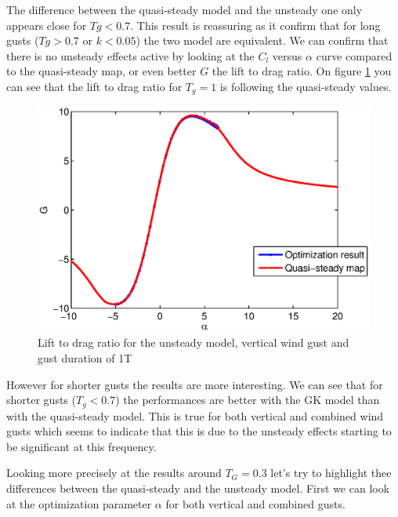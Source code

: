\par The difference between the quasi-steady model and the unsteady one only appears close for $Tg<0.7$.
This result is reassuring as it confirm that for long gusts ($Tg>0.7$ or $k<0.05$) the two model are equivalent.
We can confirm that there is no unsteady effects active by looking at the $C_l$ versus $\alpha$ curve compared to the quasi-steady map, or even better $G$ the lift to drag ratio.
On figure \ref{fig:G_vs_alpha_wt=1_Tg=1_GK.eps} you can see that the lift to drag ratio for $T_g=1$ is following the quasi-steady values.

\begin{figure}[h]
  \centering
  \includegraphics{./Figures/G_vs_alpha_wt=1_Tg=1_GK.eps}
  \caption{Lift to drag ratio for the unsteady model, vertical wind gust and gust duration of 1T}
  \label{fig:G_vs_alpha_wt=1_Tg=1_GK.eps}
\end{figure}

\par However for shorter gusts the results are more interesting.
We can see that for shorter gusts ($T_g<0.7$) the performances are better with the GK model than with the quasi-steady model.
This is true for both vertical and combined wind gusts which seems to indicate that this is due to the unsteady effects starting to be significant at this frequency.

\FloatBarrier

\par Looking more precisely at the results around $T_G=0.3$ let's try to highlight thee differences between the quasi-steady and the unsteady model.
First we can look at the optimization parameter $\alpha$ for both vertical and combined gusts.

